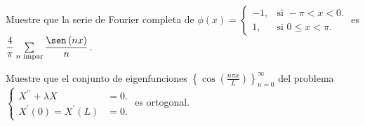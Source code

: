 \question

Muestre que la serie de Fourier completa de
\begin{math}
	\phi\left(x\right)=
	\begin{cases}
		-1, & \text{si }-\pi<x<0.    \\
		1,  & \text{si }0\leq x<\pi.
	\end{cases}
\end{math}
es
\begin{math}
	\dfrac{4}{\pi}
	\sum\limits_{n\text{ impar}}
	\dfrac{\sen\left(nx\right)}{n}
\end{math}.

\question

Muestre que el conjunto de eigenfunciones
\begin{math}
	\left\{
	\cos\left(\frac{n\pi x}{L}\right)
	\right\}_{n=0}^{\infty}
\end{math}
del problema
\begin{math}
	\left\{
		\begin{aligned}
			X^{\prime\prime}+
			\lambda X                & =
			0.                           \\
			X^{\prime}\left(0\right)=
			X^{\prime}\left(L\right) & =
			0.
		\end{aligned}
		\right.
	\end{math}\linebreak
es ortogonal.

\question


